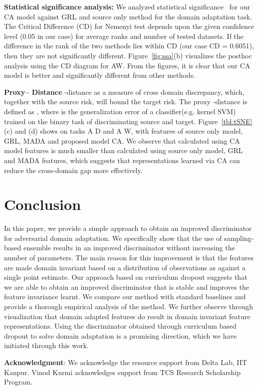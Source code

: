 \documentclass{bmvc2k}
\begin{document}
\noindent\textbf{{Statistical significance analysis:}}
We analyzed statistical significance~\cite{demvsar_JMLR2006} for our CA model against GRL\cite{ganin_ICML2015} and source only method for the domain adaptation task. The Critical Difference (CD) for Nemenyi test depends upon the given confidence level (0.05 in our case) for average ranks and  number of tested datasets. If the difference in the rank of the two methods lies within CD (our case CD = 0.6051), then they are not significantly different. Figure~\ref{fig:ssa}(b) visualizes the posthoc analysis using the CD diagram for AW. From the figures, it is clear that our CA model is better and significantly different from other methods.







 




\noindent\textbf{{Proxy-- Distance}}
  -distance as a measure of cross domain discrepancy\cite{ben_ML2010}, which, together with the source risk, will bound the target risk. The proxy -distance is defined as , where  is the generalization error of a classifier(e.g. kernel SVM) trained on the binary task of discriminating source and target. Figure~\ref{tbl:tSNE}(c) and (d) shows  on tasks A D and  A W, with features of source only model\cite{krizhevsky_NIPS2012}, GRL\cite{ganin_ICML2015}, MADA\cite{pei_arxiv2018} and proposed model CA. We observe that  calculated using CA model features is much smaller than calculated using source only model, GRL and MADA features, which suggests that representations learned via CA can reduce the cross-domain gap more effectively. 
\section{Conclusion}
In this paper, we provide a simple approach to obtain an improved discriminator for adversarial domain adaptation. We specifically show that the use of sampling-based ensemble results in an improved discriminator without increasing the number of parameters. The main reason for this improvement is that the features are made domain invariant based on a distribution of observations as against a single point estimate. Our approach based on curriculum dropout suggests that we are able to obtain an improved discriminator that is stable and improves the feature invariance learnt. We compare our method with standard baselines and provide a thorough empirical analysis of the method. We further observe through visualization that domain adapted features do result in domain invariant feature representations. 
Using the discriminator obtained through curriculum based dropout to solve domain adaptation is a promising direction, which we have initiated through this work.

\textbf{Acknowledgment}:  We acknowledge the resource support from Delta Lab, IIT Kanpur. Vinod Kurmi acknowledges support from TCS Research Scholarship Program.
\newpage


\end{document}
